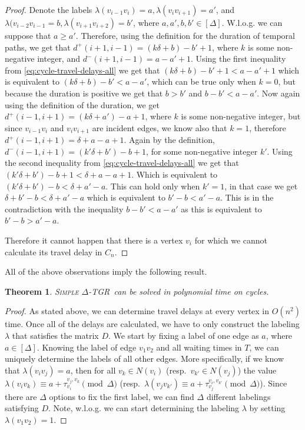 \documentclass[11pt,a4paper]{article}
\newtheorem{theorem}{Theorem}
\theoremstyle{remark}
\theoremstyle{definition}
\newcommand{\deltaExact}{\textsc{Simple $\Delta$-TGR}}
\begin{document}
\begin{proof}
    Denote the labels $\lambda(v_{i-1}v_i) = a, \lambda(v_{i}v_{i+1})=a'$, and $\lambda(v_{i-2}v_{i-1} = b, \lambda (v_{i+1}v_{i+2})=b'$, where $a,a',b,b' \in [\Delta]$.
    W.l.o.g. we can suppose that $a \geq a'$.
    Therefore, using the definition for the duration of temporal paths, we get that
    $d^+(i+1,i-1) = (k \delta + b) - b' + 1$, where $k$ is some non-negative integer, and $d^-(i+1,i-1) = a - a' + 1$.
    Using the first inequality from \cref{eq:cycle-travel-delays-all} we get that 
    $(k \delta + b) - b' +1 < a - a' + 1$ which is equivalent to $(k \delta + b) - b' < a - a'$, which can be true only when $k = 0$, but because the duration is positive we get that $b > b'$ and
    $b - b' < a - a'$.
    Now again using the definition of the duration, we get
    $d^+(i-1,i+1)= (k\delta + a') - a + 1$, where $k$ is some non-negative integer, but since $v_{i-1}v_i$ and $v_iv_{i+1}$ are incident edges, we know also that $k=1$, therefore $d^+(i-1,i+1)= \delta + a - a + 1$. 
    Again by the definition, $d^-(i-1,i+1) = (k' \delta + b') -b + 1$, for some non-negative integer $k'$.
    Using the second inequality from \cref{eq:cycle-travel-delays-all} we get that 
    $(k' \delta + b') -b + 1 < \delta + a - a + 1$.
    Which is equivalent to  $(k' \delta + b') -b < \delta + a' - a $. This can hold only when $k' = 1$, in that case we get $ \delta + b' -b < \delta + a' - a $ which is equivalent to $b' -b < a' - a$.
    This is in the contradiction with the inequality  $b - b' < a - a'$ as this is equivalent to $b'-b > a'-a$.
    
    Therefore it cannot happen that there is a vertex $v_i$ for which we cannot calculate its travel delay in $C_n$.
\end{proof}

All of the above observations imply the following result.
\begin{theorem}
    \deltaExact\ can be solved in polynomial time on cycles.
\end{theorem}

\begin{proof}
As stated above, we can determine travel delays at every vertex in $O(n^2)$ time. 
Once all of the delays are calculated, we have to only construct the labeling $\lambda$ that satisfies the matrix $D$. 
We start by fixing a label of one edge as $a$, where $a \in [\Delta]$.
Knowing the label of edge $v_1v_2$ and all waiting times in $T$, we can uniquely determine the labels of all other edges.
More specifically, if we know that $\lambda(v_i v_j) = a$, then for all $v_k \in N(v_i)$ (resp.~$v_{k'} \in N(v_j)$)
the value $\lambda(v_iv_k) \equiv a + \tau_{v_i}^{v_j,v_k} \pmod \Delta $ (resp.~$\lambda(v_j v_{k'}) \equiv a + \tau_{v_j}^{v_i,v_{k'}} \pmod \Delta $).
Since there are $\Delta$ options to fix the first label, we can find $\Delta$ different labelings satisfying $D$.
Note, w.l.o.g. we can start determining the labeling $\lambda$ by setting $\lambda(v_1v_2) = 1$.
\end{proof}
\end{document}
